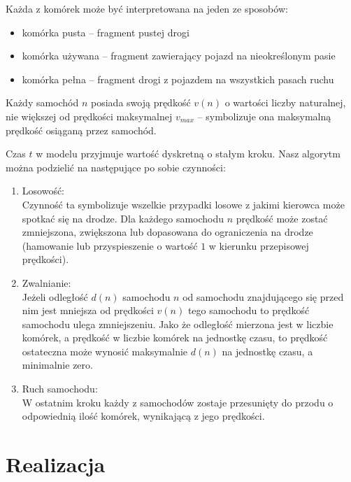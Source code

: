 \documentclass[a4paper,12pt]{article}
\begin{document}
    Każda z komórek może być interpretowana na jeden ze sposobów:
    
    \begin{itemize}
    	\item komórka pusta -- fragment pustej drogi
    	\item komórka używana -- fragment zawierający pojazd na nieokreślonym pasie
    	\item komórka pełna -- fragment drogi z pojazdem na wszystkich pasach ruchu
    \end{itemize}

	Każdy samochód $n$ posiada swoją prędkość $v(n)$ o wartości liczby naturalnej, nie większej od prędkości maksymalnej $v_{max}$ -- symbolizuje ona maksymalną prędkość osiąganą przez samochód.
	
	Czas $t$ w modelu przyjmuje wartość dyskretną o stałym kroku. Nasz algorytm można podzielić na następujące po sobie czynności:

	\begin{enumerate}
		\item Losowość: \\
		Czynność ta symbolizuje wszelkie przypadki losowe z jakimi kierowca może spotkać się na drodze.
		Dla każdego samochodu $n$ prędkość może zostać zmniejszona, zwiększona lub dopasowana do ograniczenia na drodze (hamowanie lub przyspieszenie o wartość $1$ w kierunku przepisowej prędkości).
		
		\item Zwalnianie: \\
		Jeżeli odległość $d(n)$ samochodu $n$ od samochodu znajdującego się przed nim jest mniejsza od prędkości $v(n)$ tego samochodu to prędkość samochodu ulega zmniejszeniu. Jako że odległość mierzona jest w liczbie komórek, a prędkość w liczbie komórek na jednostkę czasu, to prędkość ostateczna może wynosić maksymalnie $d(n)$ na jednostkę czasu, a minimalnie zero.
		
		\item Ruch samochodu: \\
		W ostatnim kroku każdy z samochodów zostaje przesunięty do przodu o odpowiednią ilość komórek, wynikającą z jego prędkości.
	\end{enumerate}

    \part{Realizacja}
    
\end{document}
